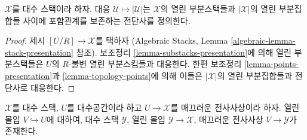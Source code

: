 \begin{lemma}
\label{lemma-open-substacks}
$\mathcal{X}$를 대수 스택이라 하자. 대응
$\mathcal{U} \mapsto |\mathcal{U}|$는 $\mathcal{X}$의 열린 부분스택들과
$|\mathcal{X}|$의 열린 부분집합들 사이에 포함관계를 보존하는 전단사를 정의한다.
\end{lemma}

\begin{proof}
제시 $[U/R] \to \mathcal{X}$를 택하자
(Algebraic Stacks, Lemma \ref{algebraic-lemma-stack-presentation} 참조).
보조정리 \ref{lemma-substacks-presentation}에 의해 열린 부분스택들은
$U$의 $R$-불변 열린 부분스킴들과 대응한다. 한편 보조정리
\ref{lemma-points-presentation}과 \ref{lemma-topology-points}에 의해
이들은 $|\mathcal{X}|$의 열린 부분집합들과 전단사로 대응한다.
\end{proof}

\begin{lemma}
\label{lemma-open-image-substack}
$\mathcal X$를 대수 스택, $U$를 대수공간이라 하고
$U \to \mathcal X$를 매끄러운 전사사상이라 하자. 열린 몰입
$V \hookrightarrow U$에 대하여, 대수 스택 $\mathcal Y$, 열린 몰입
$\mathcal Y \to \mathcal X$, 매끄러운 전사사상 $V \to \mathcal Y$가 존재한다.
\end{lemma}

